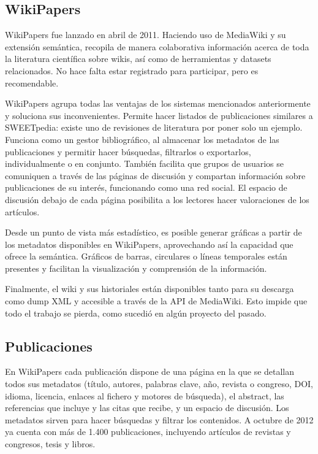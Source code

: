 \documentclass[twoside]{article}
\begin{document}
\begin{multicols}{2}
\section{WikiPapers}
WikiPapers fue lanzado en abril de 2011. Haciendo uso de MediaWiki y su extensi\'{o}n sem\'{a}ntica, recopila de manera colaborativa informaci\'{o}n acerca de toda la literatura cient\'{i}fica sobre wikis, as\'{i} como de herramientas y datasets relacionados. No hace falta estar registrado para participar, pero es recomendable.

WikiPapers agrupa todas las ventajas de los sistemas mencionados anteriormente y soluciona sus inconvenientes. Permite hacer listados de publicaciones similares a SWEETpedia: existe uno de revisiones de literatura por poner solo un ejemplo. Funciona como un gestor bibliogr\'{a}fico, al almacenar los metadatos de las publicaciones y permitir hacer b\'{u}squedas, filtrarlos o exportarlos, individualmente o en conjunto. Tambi\'{e}n facilita que grupos de usuarios se comuniquen a trav\'{e}s de las p\'{a}ginas de discusi\'{o}n y compartan informaci\'{o}n sobre publicaciones de su inter\'{e}s, funcionando como una red social. El espacio de discusi\'{o}n debajo de cada p\'{a}gina posibilita a los lectores hacer valoraciones de los art\'{i}culos.

Desde un punto de vista m\'{a}s estad\'{i}stico, es posible generar gr\'{a}ficas a partir de los metadatos disponibles en WikiPapers, aprovechando as\'{i} la capacidad que ofrece la sem\'{a}ntica. Gr\'{a}ficos de barras, circulares o l\'{i}neas temporales est\'{a}n presentes y facilitan la visualizaci\'{o}n y comprensi\'{o}n de la informaci\'{o}n.

Finalmente, el wiki y sus historiales est\'{a}n disponibles tanto para su descarga como dump XML y accesible a trav\'{e}s de la API de MediaWiki. Esto impide que todo el trabajo se pierda, como sucedi\'{o} en alg\'{u}n proyecto del pasado.

\subsection{Publicaciones}
En WikiPapers cada publicaci\'{o}n dispone de una p\'{a}gina en la que se detallan todos sus metadatos (t\'{i}tulo, autores, palabras clave, a\~{n}o, revista o congreso, DOI, idioma, licencia, enlaces al fichero y motores de b\'{u}squeda), el abstract, las referencias que incluye y las citas que recibe, y un espacio de discusi\'{o}n. Los metadatos sirven para hacer b\'{u}squedas y filtrar los contenidos. A octubre de 2012 ya cuenta con m\'{a}s de 1.400 publicaciones, incluyendo art\'{i}culos de revistas y congresos, tesis y libros.


\end{multicols}
\end{document}
